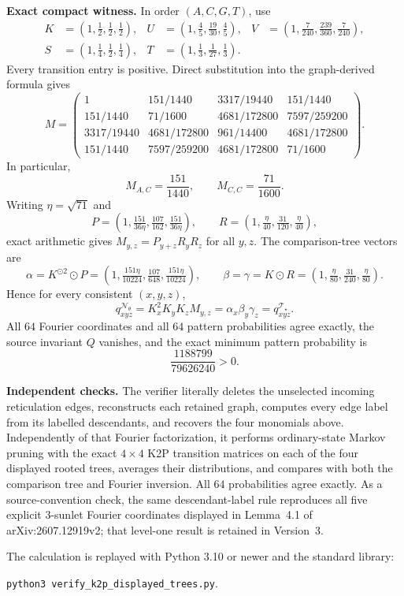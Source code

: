 \documentclass[10pt]{article}
\newcommand{\odotv}{\mathbin{\odot}}
\begin{document}
\newpage
\textbf{Exact compact witness.} In order $(A,C,G,T)$, use
\[
\begin{aligned}
K&=(1,\tfrac12,\tfrac12,\tfrac12),&U&=(1,\tfrac45,\tfrac{19}{30},\tfrac45),&V&=(1,\tfrac7{240},\tfrac{239}{360},\tfrac7{240}),\\
S&=(1,\tfrac14,\tfrac12,\tfrac14),&T&=(1,\tfrac13,\tfrac1{27},\tfrac13).
\end{aligned}
\]
Every transition entry is positive. Direct substitution into the graph-derived formula gives
\[
M=\begin{pmatrix}
1&151/1440&3317/19440&151/1440\\
151/1440&71/1600&4681/172800&7597/259200\\
3317/19440&4681/172800&961/14400&4681/172800\\
151/1440&7597/259200&4681/172800&71/1600
\end{pmatrix}.
\]
In particular,
\[
M_{A,C}=\frac{151}{1440},\qquad M_{C,C}=\frac{71}{1600}.
\]
Writing $\eta=\sqrt{71}$ and
\[
P=(1,\tfrac{151}{36\eta},\tfrac{107}{162},\tfrac{151}{36\eta}),\qquad
R=(1,\tfrac{\eta}{40},\tfrac{31}{120},\tfrac{\eta}{40}),
\]
exact arithmetic gives $M_{y,z}=P_{y+z}R_yR_z$ for all $y,z$. The comparison-tree vectors are
\[
\alpha=K^{\odotv2}\odotv P=(1,\tfrac{151\eta}{10224},\tfrac{107}{648},\tfrac{151\eta}{10224}),\qquad
\beta=\gamma=K\odotv R=(1,\tfrac{\eta}{80},\tfrac{31}{240},\tfrac{\eta}{80}).
\]
Hence for every consistent $(x,y,z)$,
\[
q^{\mathcal N_\theta}_{xyz}=K_x^2K_yK_zM_{y,z}=\alpha_x\beta_y\gamma_z=q^{\mathcal T_\star}_{xyz}.
\]
All $64$ Fourier coordinates and all $64$ pattern probabilities agree exactly, the source invariant $Q$ vanishes, and the exact minimum pattern probability is
\[
\frac{1188799}{79626240}>0.
\]

\textbf{Independent checks.} The verifier literally deletes the unselected incoming reticulation edges, reconstructs each retained graph, computes every edge label from its labelled descendants, and recovers the four monomials above. Independently of that Fourier factorization, it performs ordinary-state Markov pruning with the exact $4\times4$ K2P transition matrices on each of the four displayed rooted trees, averages their distributions, and compares with both the comparison tree and Fourier inversion. All $64$ probabilities agree exactly. As a source-convention check, the same descendant-label rule reproduces all five explicit 3-sunlet Fourier coordinates displayed in Lemma~4.1 of arXiv:2607.12919v2; that level-one result is retained in Version~3.

The calculation is replayed with Python 3.10 or newer and the standard library:
\begin{center}
\texttt{python3 verify\_k2p\_displayed\_trees.py}.
\end{center}
\end{document}
